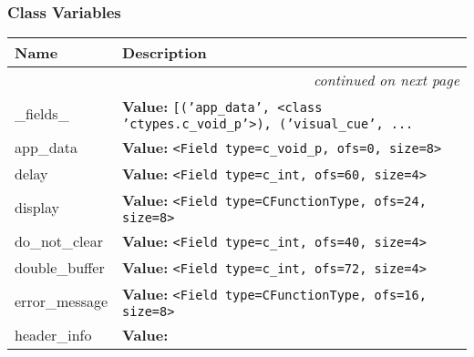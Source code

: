
  \subsubsection{Class Variables}

    \vspace{-1cm}
\hspace{\varindent}\begin{longtable}{|p{\varnamewidth}|p{\vardescrwidth}|l}
\cline{1-2}
\cline{1-2} \centering \textbf{Name} & \centering \textbf{Description}& \\
\cline{1-2}
\endhead\cline{1-2}\multicolumn{3}{r}{\small\textit{continued on next page}}\\\endfoot\cline{1-2}
\endlastfoot\raggedright \_\-f\-i\-e\-l\-d\-s\-\_\- & \raggedright \textbf{Value:} 
{\tt \texttt{[}\texttt{(}\texttt{'}\texttt{app\_data}\texttt{'}\texttt{, }{\textless}class 'ctypes.c\_void\_p'{\textgreater}\texttt{)}\texttt{, }\texttt{(}\texttt{'}\texttt{visual\_cue}\texttt{'}\texttt{, }\texttt{...}}&\\
\cline{1-2}
\raggedright a\-p\-p\-\_\-d\-a\-t\-a\- & \raggedright \textbf{Value:} 
{\tt {\textless}Field type=c\_void\_p, ofs=0, size=8{\textgreater}}&\\
\cline{1-2}
\raggedright d\-e\-l\-a\-y\- & \raggedright \textbf{Value:} 
{\tt {\textless}Field type=c\_int, ofs=60, size=4{\textgreater}}&\\
\cline{1-2}
\raggedright d\-i\-s\-p\-l\-a\-y\- & \raggedright \textbf{Value:} 
{\tt {\textless}Field type=CFunctionType, ofs=24, size=8{\textgreater}}&\\
\cline{1-2}
\raggedright d\-o\-\_\-n\-o\-t\-\_\-c\-l\-e\-a\-r\- & \raggedright \textbf{Value:} 
{\tt {\textless}Field type=c\_int, ofs=40, size=4{\textgreater}}&\\
\cline{1-2}
\raggedright d\-o\-u\-b\-l\-e\-\_\-b\-u\-f\-f\-e\-r\- & \raggedright \textbf{Value:} 
{\tt {\textless}Field type=c\_int, ofs=72, size=4{\textgreater}}&\\
\cline{1-2}
\raggedright e\-r\-r\-o\-r\-\_\-m\-e\-s\-s\-a\-g\-e\- & \raggedright \textbf{Value:} 
{\tt {\textless}Field type=CFunctionType, ofs=16, size=8{\textgreater}}&\\
\cline{1-2}
\raggedright h\-e\-a\-d\-e\-r\-\_\-i\-n\-f\-o\- & \raggedright \textbf{Value:} 

\end{longtable}

